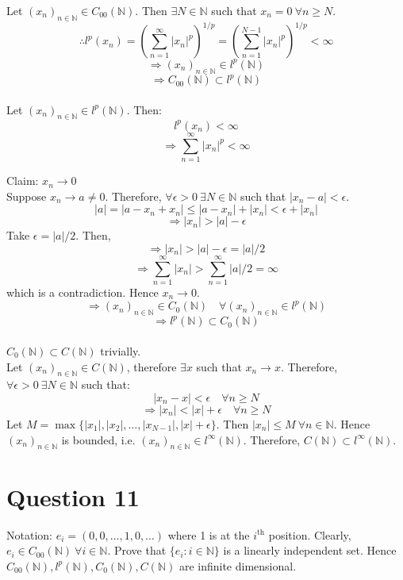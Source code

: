 \documentclass{article}
\begin{document}
	Let $(x_n)_{n \in \mathbb{N}} \in C_{00}(\mathbb{N})$.
	Then $\exists N \in \mathbb{N}$ such that $x_n = 0 ~ \forall n \ge N$.
	\[ \therefore l^p(x_n) = \left(\sum_{n = 1}^{\infty} |x_n|^p\right) ^ {1/p}
	= \left(\sum_{n = 1}^{N - 1} |x_n|^p\right) ^ {1/p}
	< \infty \]
	\[ \Rightarrow (x_n)_{n \in \mathbb{N}} \in l^p(\mathbb{N}) \]
	\[ \Rightarrow C_{00}(\mathbb{N}) \subset l^p(\mathbb{N}) \] \\

	Let $(x_n)_{n \in \mathbb{N}} \in l^p(\mathbb{N})$.
	Then:
	\[ l^p(x_n) < \infty \]
	\[ \Rightarrow \sum_{n = 1}^{\infty} |x_n|^p < \infty \]

	Claim: $x_n \to 0$ \\
	Suppose $x_n \to a \ne 0$.
	Therefore, $\forall \epsilon > 0 ~ \exists N \in \mathbb{N}$ such that $|x_n - a| < \epsilon$.
	\[ |a| = |a - x_n + x_n| \le |a - x_n| + |x_n| < \epsilon + |x_n| \]
	\[ \Rightarrow |x_n| > |a| - \epsilon \]
	Take $\epsilon = |a| / 2$.
	Then,
	\[ \Rightarrow |x_n| > |a| - \epsilon = |a| / 2 \]
	\[ \Rightarrow \sum_{n = 1}^{\infty} |x_n| > \sum_{n = 1}^{\infty} |a| / 2 = \infty \]
	which is a contradiction.
	Hence $x_n \to 0$. \\
	\[
		\Rightarrow (x_n)_{n \in \mathbb{N}} \in C_0(\mathbb{N}) \quad
		\forall (x_n)_{n \in \mathbb{N}} \in l^p(\mathbb{N})
	\]
	\[ \Rightarrow l^p(\mathbb{N}) \subset C_0(\mathbb{N}) \] \\

	$C_0(\mathbb{N}) \subset C(\mathbb{N})$ trivially. \\

	Let $(x_n)_{n \in \mathbb{N}} \in C(\mathbb{N})$, therefore $\exists x$ such that $x_n \to x$.
	Therefore, $\forall \epsilon > 0 ~ \exists N \in \mathbb{N}$ such that:
	\[ |x_n - x| < \epsilon \quad \forall n \ge N \]
	\[ \Rightarrow |x_n| < |x| + \epsilon \quad \forall n \ge N \]
	Let $M = \max\{|x_1|, |x_2|, \dots, |x_{N - 1}|, |x| + \epsilon\}$.
	Then $|x_n| \le M ~ \forall n \in \mathbb{N}$.
	Hence $(x_n)_{n \in \mathbb{N}}$ is bounded, i.e.
	$(x_n)_{n \in \mathbb{N}} \in l^{\infty}(\mathbb{N})$.
	Therefore, $C(\mathbb{N}) \subset l^{\infty}(\mathbb{N})$.

\section{Question 11}

	Notation: $e_i = (0, 0, \dots, 1, 0, \dots)$ where 1 is at the $i^{\text{th}}$ position.
	Clearly, $e_i \in C_{00}(\mathbb{N}) ~ \forall i \in \mathbb{N}$.
	Prove that $\{e_i: i \in \mathbb{N}\}$ is a linearly independent set.
	Hence $C_{00}(\mathbb{N}), l^p(\mathbb{N}), C_0(\mathbb{N}), C(\mathbb{N})$ are infinite
	dimensional. \\
\end{document}
